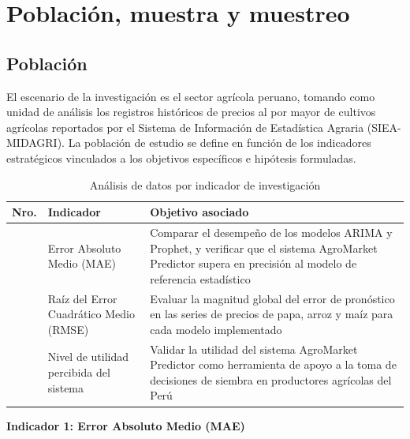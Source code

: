 \documentclass[12pt, a4paper]{report}
\begin{document}
\section{Población, muestra y muestreo}

\subsection{Población}

El escenario de la investigación es el sector agrícola peruano, tomando como unidad de análisis los registros históricos de precios al por mayor de cultivos agrícolas reportados por el Sistema de Información de Estadística Agraria (SIEA-MIDAGRI). La población de estudio se define en función de los indicadores estratégicos vinculados a los objetivos específicos e hipótesis formuladas.

\vspace{0.5cm}

\begin{table}[h!]
\centering
\caption{Análisis de datos por indicador de investigación}
\label{tab:analisis_datos}
\singlespacing
\small
\begin{tabular}{|>{\centering\arraybackslash}p{1cm}
                |>{\raggedright\arraybackslash}p{4.5cm}
                |>{\raggedright\arraybackslash}p{7.5cm}|}
\hline
\textbf{Nro.} & \textbf{Indicador} & \textbf{Objetivo asociado} \\
\hline
1 & Error Absoluto Medio (MAE) &
  Comparar el desempeño de los modelos ARIMA y Prophet, y verificar que el sistema
  AgroMarket Predictor supera en precisión al modelo de referencia estadístico \\
\hline
2 & Raíz del Error Cuadrático Medio (RMSE) &
  Evaluar la magnitud global del error de pronóstico en las series de precios de
  papa, arroz y maíz para cada modelo implementado \\
\hline
3 & Nivel de utilidad percibida del sistema &
  Validar la utilidad del sistema AgroMarket Predictor como herramienta de apoyo
  a la toma de decisiones de siembra en productores agrícolas del Perú \\
\hline
\end{tabular}
\end{table}

\vspace{0.3cm}

\textbf{Indicador 1: Error Absoluto Medio (MAE)}
\end{document}
